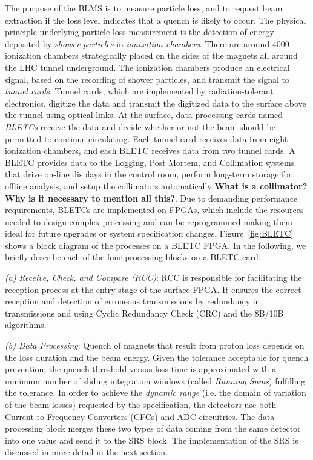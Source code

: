 \documentclass{llncs}
\begin{document}
The purpose of the BLMS is to measure particle loss, and to request beam extraction if the loss level indicates that a quench is likely to occur.
The physical principle underlying particle loss measurement \cite{Dehning-IPAC,Chris-FPGA} is the detection of energy deposited by \emph{shower particles} in \emph{ionization chambers}.
There are around 4000 ionization chambers strategically placed on the sides of the magnets all around the LHC tunnel underground.
The ionization chambers produce an electrical signal, based on the recording of shower particles, and transmit the signal to \emph{tunnel cards}.
Tunnel cards, which are implemented by radiation-tolerant electronics, digitize the data and transmit the digitized data to the surface above the tunnel using optical links.
At the surface, data processing cards named \emph{BLETCs} receive the data and decide whether or not the beam should be permitted to continue circulating.
Each tunnel card receives data from eight ionization chambers, and each BLETC receives data from two tunnel cards.
A BLETC provides data to the Logging, Post Mortem, and Collimation systems that drive on-line displays in the control room, perform long-term storage for offline analysis, and setup the collimators automatically {\bf What is a collimator? Why is it necessary to mention all this?}.
Due to demanding performance requirements, BLETCs are implemented on FPGAs, which include the resources needed to design complex processing and can be reprogrammed making them ideal for future upgrades or system specification changes.
Figure~\ref{fig:BLETC} shows a block diagram of the processes on a BLETC FPGA.
In the following, we briefly describe each of the four processing blocks on a BLETC card.


\emph{(a) Receive, Check, and Compare (RCC)}: RCC is responsible for facilitating the reception process at the entry stage of the surface FPGA.
It ensures the correct reception and detection of erroneous transmissions by redundancy in transmissions and using Cyclic Redundancy Check (CRC) and the 8B/10B algorithms.

\emph{(b) Data Processing}: Quench of magnets that result from proton loss depends on the loss duration and the beam energy.
Given the tolerance acceptable for quench prevention, the quench threshold versus loss time is approximated with a minimum number of sliding integration windows (called \emph{Running Sums}) fulfilling the tolerance.
In order to achieve the \emph{dynamic range} (i.e. the domain of variation of the beam losses) requested by the specification, the detectors use both Current-to-Frequency Converters (CFCs) and ADC circuitries.
The data processing block merges these two types of data coming from the same detector into one value and send it to the SRS block.
The implementation of the SRS is discussed in more detail in the next section.
\end{document}
